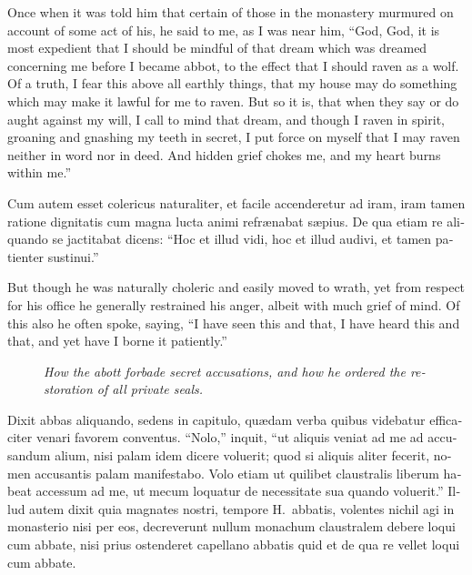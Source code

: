 \documentclass{book}
\newcommand{\blockhead}[4][]{
\begin{figure}
\centering
\vspace{#4}
\parbox{2.75cm}{\begin{center}\footnotesize \color{BrickRed} \emph{#2}\\ #1 \end{center}}
\end{figure}
}
\begin{document}
\begin{paracol}{2}
\begin{otherlanguage}{latin}
\end{otherlanguage}

\switchcolumn

Once when it was told him that certain of those in the monastery murmured on account of some act of his, he said to me, as I was near him, ``God, God, it is most expedient that I should be mindful of that dream which was dreamed concerning me before I became abbot, to the effect that I should raven as a wolf. Of a truth, I fear this above all earthly things, that my house may do something which may make it lawful for me to raven. But so it is, that when they say or do aught against my will, I call to mind that dream, and though I raven in spirit, groaning and gnashing my teeth in secret, I put force on myself that I may raven neither in word nor in deed. And hidden grief chokes me, and my heart burns within me.''

\switchcolumn*

\begin{otherlanguage}{latin}
Cum autem esset colericus naturaliter, et facile accenderetur ad iram, iram tamen ratione dignitatis cum magna lucta animi refr\ae{}nabat s\ae{}pius. De qua etiam re aliquando se jactitabat dicens: ``Hoc et illud vidi, hoc et illud audivi, et tamen patienter sustinui.''
\end{otherlanguage}

\switchcolumn

But though he was naturally choleric and easily moved to wrath, yet from respect for his office he generally restrained his anger, albeit with much grief of mind. Of this also he often spoke, saying, ``I have seen this and that, I have heard this and that, and yet have I borne it patiently.''

\switchcolumn*

\begin{otherlanguage}{latin}
\blockhead{How the abott forbade secret accusations, and how he ordered the restoration of all private seals.}{4}{-0.65cm}
Dixit abbas aliquando, sedens in capitulo, qu\ae{}dam verba quibus videbatur efficaciter venari favorem conventus. ``Nolo,'' inquit, ``ut aliquis veniat ad me ad accusandum alium, nisi palam idem dicere voluerit; quod si aliquis aliter fecerit, nomen accusantis palam manifestabo. Volo etiam ut quilibet claustralis liberum habeat accessum ad me, ut mecum loquatur de necessitate sua quando voluerit.'' Illud autem dixit quia magnates nostri, tempore H.\ abbatis, volentes nichil agi in monasterio nisi per eos, decreverunt nullum monachum claustralem debere loqui cum abbate, nisi prius ostenderet capellano abbatis quid et de qua re vellet loqui cum abbate.


\end{otherlanguage}
\end{paracol}
\end{document}
